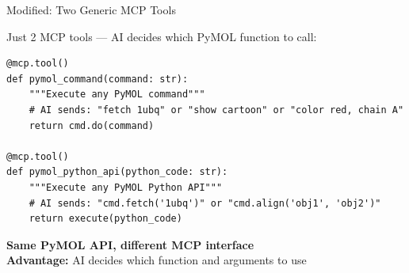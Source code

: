 \documentclass[aspectratio=169]{beamer}
\begin{document}
\begin{frame}[fragile]{Modified: Two Generic MCP Tools}

\vspace{0.1cm}
\small
Just 2 MCP tools — AI decides which PyMOL function to call:

\vspace{0.2cm}

\begin{verbatim}
@mcp.tool()
def pymol_command(command: str):
    """Execute any PyMOL command"""
    # AI sends: "fetch 1ubq" or "show cartoon" or "color red, chain A"
    return cmd.do(command)

@mcp.tool()
def pymol_python_api(python_code: str):
    """Execute any PyMOL Python API"""
    # AI sends: "cmd.fetch('1ubq')" or "cmd.align('obj1', 'obj2')"
    return execute(python_code)
\end{verbatim}

\vspace{0.1cm}
\normalsize
\textbf{Same PyMOL API, different MCP interface}\\
\textbf{Advantage:} AI decides which function and arguments to use

\end{frame}
\end{document}
